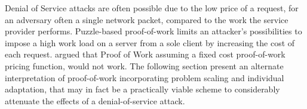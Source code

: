 %
%

Denial of Service attacks are often possible due to the low price of a request, for an adversary often a single network packet\cite{gunter}, compared to the work the service provider performs. Puzzle-based proof-of-work limits an attacker's possibilities to impose a high work load on a server from a sole client by increasing the cost of each request.   argued that Proof of Work assuming a fixed cost proof-of-work pricing function, would not work. The following section present an alternate interpretation of proof-of-work incorporating problem scaling and individual adaptation, that may in fact be a practically viable scheme to considerably attenuate the effects of a denial-of-service attack.


